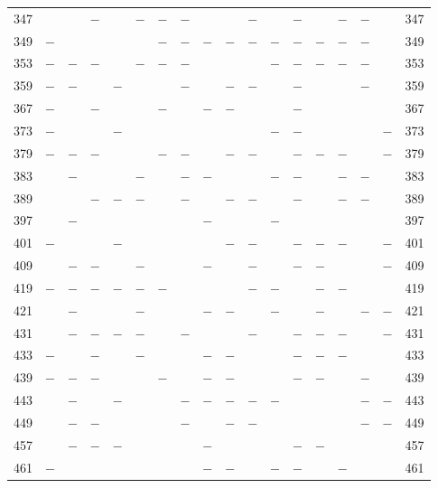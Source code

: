 \begin{center}
\begin{tabular}{r|c|c|c|c|c|c|c|c|c|c|c|c|c|c|c|c|r}
347 &  &  & $-$ &  & $-$ & $-$ & $-$ &  &  & $-$ &  & $-$ &  & $-$ & $-$ &  & 347\\
349 & $-$ &  &  &  &  & $-$ & $-$ & $-$ & $-$ & $-$ & $-$ & $-$ & $-$ & $-$ & $-$ &  & 349\\
353 & $-$ & $-$ & $-$ &  & $-$ & $-$ & $-$ &  &  &  & $-$ & $-$ & $-$ & $-$ & $-$ &  & 353\\
359 & $-$ & $-$ &  & $-$ &  &  & $-$ &  & $-$ & $-$ &  & $-$ &  &  & $-$ &  & 359\\
367 & $-$ &  & $-$ &  &  & $-$ &  & $-$ & $-$ &  &  & $-$ &  &  &  &  & 367\\
373 & $-$ &  &  & $-$ &  &  &  &  &  &  & $-$ & $-$ &  &  &  & $-$ & 373\\
379 & $-$ & $-$ & $-$ &  &  & $-$ & $-$ &  & $-$ & $-$ &  & $-$ & $-$ & $-$ &  & $-$ & 379\\
383 &  & $-$ &  &  & $-$ &  & $-$ & $-$ &  &  & $-$ & $-$ &  & $-$ & $-$ &  & 383\\
389 &  &  & $-$ & $-$ & $-$ &  & $-$ &  & $-$ & $-$ &  & $-$ &  & $-$ & $-$ &  & 389\\
397 &  & $-$ &  &  &  &  &  & $-$ &  &  & $-$ &  &  &  &  &  & 397\\
401 & $-$ &  &  & $-$ &  &  &  &  & $-$ & $-$ &  & $-$ & $-$ & $-$ &  & $-$ & 401\\
409 &  & $-$ & $-$ &  & $-$ &  &  & $-$ &  & $-$ &  & $-$ & $-$ &  &  & $-$ & 409\\
419 & $-$ & $-$ & $-$ & $-$ & $-$ & $-$ &  &  &  & $-$ & $-$ &  & $-$ & $-$ &  &  & 419\\
421 &  & $-$ &  &  & $-$ &  &  & $-$ & $-$ &  & $-$ &  & $-$ &  & $-$ & $-$ & 421\\
431 &  & $-$ & $-$ & $-$ & $-$ &  & $-$ &  &  & $-$ &  & $-$ & $-$ & $-$ &  & $-$ & 431\\
433 & $-$ &  & $-$ &  & $-$ &  &  & $-$ & $-$ &  &  & $-$ & $-$ & $-$ &  &  & 433\\
439 & $-$ & $-$ & $-$ &  &  & $-$ &  & $-$ & $-$ &  &  & $-$ & $-$ &  & $-$ &  & 439\\
443 &  & $-$ &  & $-$ &  &  & $-$ & $-$ & $-$ & $-$ & $-$ &  &  &  & $-$ & $-$ & 443\\
449 &  & $-$ & $-$ &  &  &  & $-$ &  & $-$ & $-$ &  &  &  &  & $-$ & $-$ & 449\\
457 &  & $-$ & $-$ & $-$ &  &  &  & $-$ &  &  &  & $-$ & $-$ &  &  &  & 457\\
461 & $-$ &  &  &  &  &  &  & $-$ & $-$ &  & $-$ & $-$ &  & $-$ &  &  & 461\\

\end{tabular}
\end{center}
